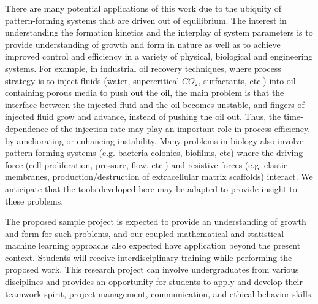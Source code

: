 There are many potential applications of this work due to the ubiquity of pattern-forming systems that are driven out of equilibrium. The interest in understanding the formation kinetics and the interplay of system parameters is to provide understanding of growth and form in nature as well as to achieve improved control and efficiency in a variety of physical, biological and engineering systems. For example, in industrial oil recovery techniques, where process strategy is to inject fluids (water, supercritical $CO_2$, surfactants, etc.) into oil containing porous media to push out the oil, the main problem is that the interface between the injected fluid and the oil becomes unstable, and fingers of injected fluid grow and advance, instead of pushing the oil out. Thus, the time-dependence of the injection rate may play an important role in process efficiency, by ameliorating or enhancing instability. Many problems in biology also involve pattern-forming systems (e.g. bacteria colonies, biofilms, etc) where the driving force (cell-proliferation, pressure, flow, etc.) and resistive forces (e.g. elastic membranes, production/destruction of extracellular matrix scaffolds) interact. We anticipate that the tools developed here may be adapted to provide insight to these problems.


The proposed sample project is expected to provide an understanding of growth and form for such problems, and our  coupled mathematical and statistical machine learning approachs also expected have application beyond the present context. Students will receive interdisciplinary training while performing the proposed work. This research project can involve undergraduates from various disciplines and provides an opportunity for students to apply and develop their teamwork spirit, project management, communication, and ethical behavior skills.

